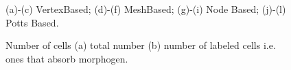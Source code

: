 \documentclass{article}
\begin{document}
\begin{figure}
{\label{fig:MonolayersNonProlif:j}
}
\caption{(a)-(c) VertexBased; (d)-(f) MeshBased; (g)-(i) Node Based; (j)-(l) Potts Based.}
\label{fig:Monolayers}
\end{figure}

\begin{figure}
\centering
\setlength{\unitlength}{1cm}
\caption{Number of cells (a) total number (b) number of labeled cells i.e. ones that absorb morphogen.}
\label{fig:DeltaNotchStats:metrics}
\end{figure}
\end{document}

